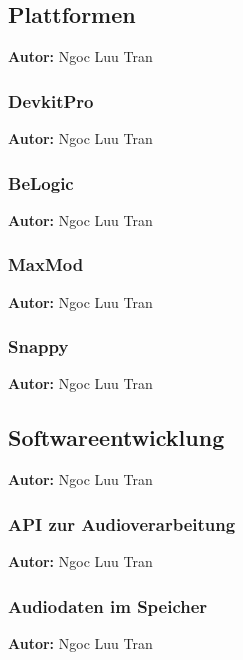\documentclass[11pt,a4paper]{scrartcl}
\newcommand{\AutorNgoc} {
    \vspace{-4mm}
    \large \textbf{Autor:} Ngoc Luu Tran \normalsize
    \vspace{2mm}
}
\begin{document}
\newpage


\subsection{Plattformen} \label{Plattformen}
\AutorNgoc


\subsubsection{DevkitPro}
\AutorNgoc


\subsubsection{BeLogic}
\AutorNgoc


\subsubsection{MaxMod}
\AutorNgoc


\subsubsection{Snappy}
\AutorNgoc


\subsection{Softwareentwicklung} \label{Softwareentwicklung}
\AutorNgoc


\subsubsection{API zur Audioverarbeitung}
\AutorNgoc


\subsubsection{Audiodaten im Speicher}
\AutorNgoc
\end{document}
